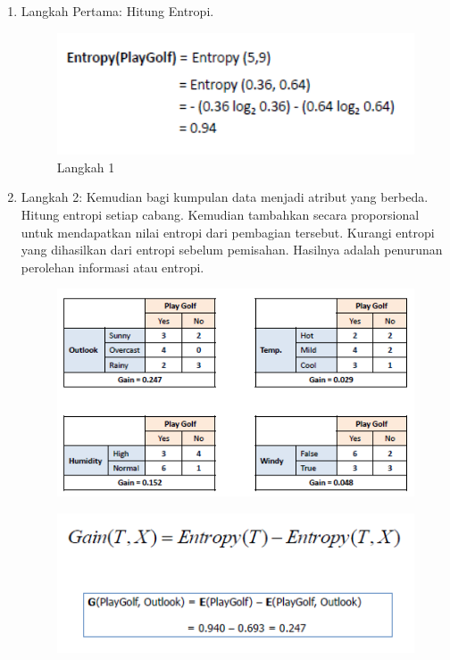 \begin{enumerate}
    \item Langkah Pertama: Hitung Entropi.
    \begin{figure}[H]
        \centering
        \includegraphics[width=12cm]{figures/chapter2/12.png}
        \caption{Langkah 1}
    \end{figure}
    \item Langkah 2: Kemudian bagi kumpulan data menjadi atribut yang berbeda. Hitung entropi setiap cabang. Kemudian tambahkan secara proporsional untuk mendapatkan nilai entropi dari pembagian tersebut. Kurangi entropi yang dihasilkan dari entropi sebelum pemisahan. Hasilnya adalah penurunan perolehan informasi atau entropi.
    \begin{figure}[H]
        \centering
        \includegraphics[width=12cm]{figures/chapter2/13.png}
    \end{figure}
    \begin{figure}[H]
        \centering
        \includegraphics[width=12cm]{figures/chapter2/14.png}

\end{figure}
\end{enumerate}
